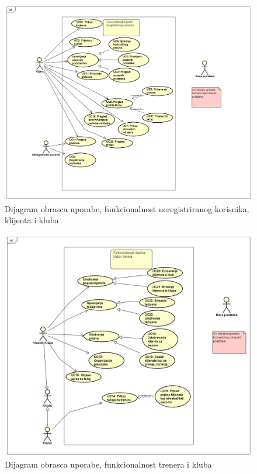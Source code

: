 					
					\begin{figure}[H]
						\centering
						\includegraphics[width=\textwidth]{slike/Diagram1.png}
						\caption{Dijagram obrasca uporabe, funkcionalnost neregistriranog korisnika, klijenta i kluba}
						\label{fig:my_label}
					\end{figure}
					\begin{figure}[H]
						\centering
						\includegraphics[width=\textwidth]{slike/Diagram2.png}
						\caption{Dijagram obrasca uporabe, funkcionalnost trenera i kluba}
						\label{fig:my_label}
					\end{figure}
